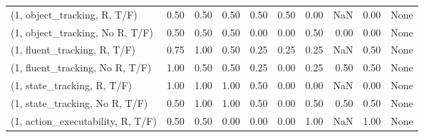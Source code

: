 \begin{table*}[h!]
\begin{adjustbox}{width=2\columnwidth,center}
\begin{tabular}{lrrr|rrr|rrr}
\midrule
(1, object\_tracking, R, T/F)         &                      0.50 &                  0.50 &                      0.50 &                          0.50 &                      0.50 &                          0.00 &                                    NaN &                               0.00 &                                  None \\
(1, object\_tracking, No R, T/F)      &                      0.50 &                  0.50 &                      0.50 &                          0.00 &                      0.00 &                          0.50 &                                   0.00 &                               0.00 &                                  None \\
(1, fluent\_tracking, R, T/F)         &                      0.75 &                  1.00 &                      0.50 &                          0.25 &                      0.25 &                          0.25 &                                    NaN &                               0.50 &                                  None \\
(1, fluent\_tracking, No R, T/F)      &                      1.00 &                  0.50 &                      0.50 &                          0.25 &                      0.00 &                          0.25 &                                   0.50 &                               0.50 &                                  None \\
(1, state\_tracking, R, T/F)          &                      1.00 &                  1.00 &                      1.00 &                          0.50 &                      0.00 &                          0.00 &                                    NaN &                               0.00 &                                  None \\
(1, state\_tracking, No R, T/F)       &                      0.50 &                  1.00 &                      1.00 &                          0.50 &                      0.00 &                          0.50 &                                   0.50 &                               0.50 &                                  None \\
(1, action\_executability, R, T/F)    &                      0.50 &                  0.50 &                      0.00 &                          0.00 &                      0.00 &                          1.00 &                                    NaN &                               1.00 &                                  None \\

\end{tabular}
\end{adjustbox}
\end{table*}
